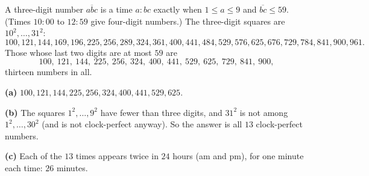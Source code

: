 A three-digit number $\overline{abc}$ is a time $a{:}bc$ exactly when $1\le a\le9$ and $\overline{bc}\le59$. (Times $10{:}00$ to $12{:}59$ give four-digit numbers.) The three-digit squares are $10^2,\dots,31^2$:
\[100,121,144,169,196,225,256,289,324,361,400,441,484,529,576,625,676,729,784,841,900,961.\]
Those whose last two digits are at most $59$ are
\[100,\ 121,\ 144,\ 225,\ 256,\ 324,\ 400,\ 441,\ 529,\ 625,\ 729,\ 841,\ 900,\]
thirteen numbers in all.

\textbf{(a)} $\boxed{100,121,144,225,256,324,400,441,529,625}$.

\textbf{(b)} The squares $1^2,\dots,9^2$ have fewer than three digits, and $31^2$ is not among $1^2,\dots,30^2$ (and is not clock-perfect anyway). So the answer is all $\boxed{13}$ clock-perfect numbers.

\textbf{(c)} Each of the $13$ times appears twice in $24$ hours (am and pm), for one minute each time: $\boxed{26}$ minutes.

